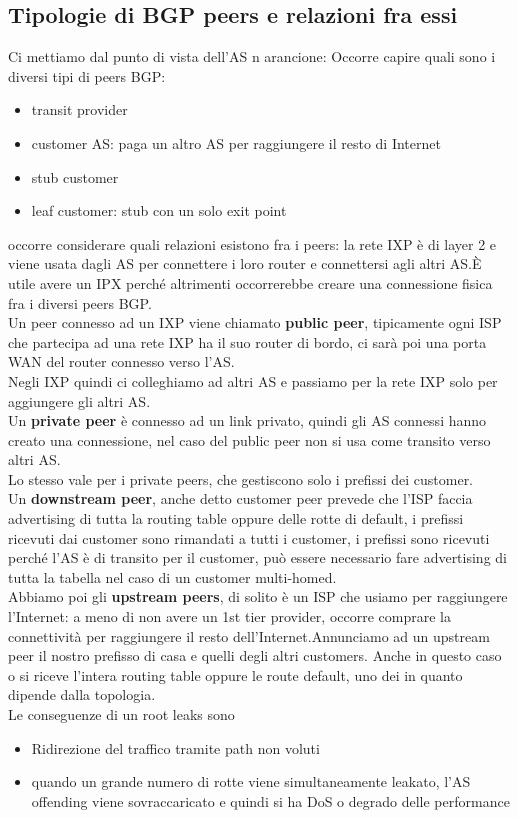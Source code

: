 \documentclass[12pt, oneside]{extbook} %
\begin{document}
\subsection{Tipologie di BGP peers e relazioni fra essi}
Ci mettiamo dal punto di vista dell'AS n arancione:
Occorre capire quali sono i diversi tipi di peers BGP:
\begin{itemize}
\item transit provider
\item customer AS: paga un altro AS per raggiungere il resto di Internet
\item stub customer
\item leaf customer: stub con un solo exit point
\end{itemize}
occorre considerare quali relazioni esistono fra i peers: la rete IXP è di layer 2 e viene usata dagli AS per connettere i loro router e connettersi agli altri AS.È utile avere un IPX perché altrimenti occorrerebbe creare una connessione fisica fra i diversi peers BGP.\\Un peer connesso ad un IXP viene chiamato \textbf{public peer}, tipicamente ogni ISP che partecipa ad una rete IXP ha il suo router di bordo, ci sarà poi una porta WAN del router connesso verso l'AS.\\Negli IXP quindi ci colleghiamo ad altri AS e passiamo per la rete IXP solo per aggiungere gli altri AS.\\Un \textbf{private peer} è connesso ad un link privato, quindi gli AS connessi hanno creato una connessione, nel caso del public peer non si usa come transito verso altri AS.\\Lo stesso vale per i private peers, che gestiscono solo i prefissi dei customer.\\Un \textbf{downstream peer}, anche detto customer peer prevede che l'ISP faccia advertising di tutta la routing table oppure delle rotte di default, i prefissi ricevuti dai customer sono rimandati a tutti i customer, i prefissi sono ricevuti perché l'AS è di transito per il customer, può essere necessario fare advertising di tutta la tabella nel caso di un customer multi-homed.\\Abbiamo poi gli \textbf{upstream peers}, di solito è un ISP che usiamo per raggiungere l'Internet: a meno di non avere un 1st tier provider, occorre comprare la connettività per raggiungere il resto dell'Internet.Annunciamo ad un upstream peer il nostro prefisso di casa e quelli degli altri customers. Anche in questo caso o si riceve l'intera routing table oppure le route default, uno dei in quanto dipende dalla topologia.\\Le conseguenze di un root leaks sono
\begin{itemize}
\item Ridirezione del traffico tramite path non voluti
\item quando un grande numero di rotte viene simultaneamente leakato, l'AS offending viene sovraccaricato e quindi si ha DoS o degrado delle performance
\end{itemize}
\end{document}
